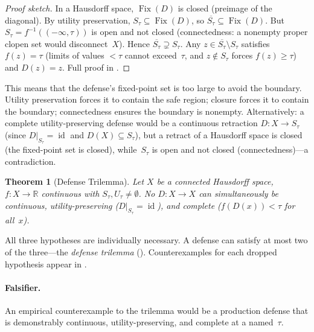 \documentclass[11pt]{article}
\newtheorem{theorem}{Theorem}[section]
\newcommand{\R}{\mathbb{R}}
\newcommand{\cl}[1]{\overline{#1}}
\newcommand{\Fix}{\operatorname{Fix}}
\newcommand{\id}{\operatorname{id}}
\begin{document}
\begin{proof}[Proof sketch]
In a Hausdorff space, $\Fix(D)$ is closed (preimage of the diagonal).
By utility preservation, $S_\tau \subseteq \Fix(D)$, so
$\cl{S_\tau} \subseteq \Fix(D)$. But $S_\tau = f^{-1}((-\infty,\tau))$
is open and not closed (connectedness: a nonempty proper clopen set
would disconnect~$X$). Hence $\cl{S_\tau} \supsetneq S_\tau$. Any
$z \in \cl{S_\tau}\setminus S_\tau$ satisfies $f(z) = \tau$ (limits of
values ${<}\tau$ cannot exceed~$\tau$, and $z \notin S_\tau$ forces
$f(z) \geq \tau$) and $D(z) = z$. Full proof in .
\end{proof}

This means that the defense's fixed-point set is too large to avoid the
boundary. Utility preservation forces it to contain the safe region;
closure forces it to contain the boundary; connectedness ensures the
boundary is nonempty. Alternatively: a complete utility-preserving
defense would be a continuous retraction $D\colon X \to S_\tau$
(since $D|_{S_\tau} = \id$ and $D(X) \subseteq S_\tau$), but a
retract of a Hausdorff space is closed (the fixed-point set is
closed), while~$S_\tau$ is open and not closed
(connectedness)---a contradiction.

\begin{theorem}[Defense Trilemma]
\label{thm:trilemma}
Let $X$ be a connected Hausdorff space, $f\colon X \to \R$ continuous
with $S_\tau, U_\tau \neq \emptyset$. No $D\colon X \to X$ can
simultaneously be continuous, utility-preserving ($D|_{S_\tau} = \id$),
and complete ($f(D(x)) < \tau$ for all~$x$).
\end{theorem}

All three hypotheses are individually necessary. A defense can satisfy
at most two of the three---the \emph{defense trilemma}
(). Counterexamples for each dropped hypothesis
appear in .

\paragraph{Falsifier.}
An empirical counterexample to the trilemma would be a production
defense that is demonstrably continuous, utility-preserving, and
complete at a named~$\tau$.
\end{document}
